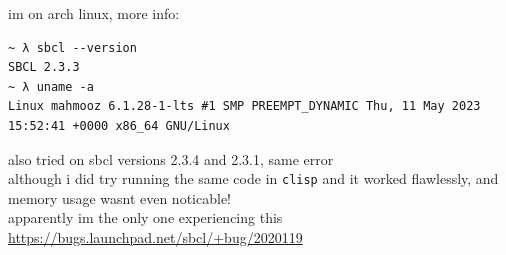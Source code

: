 \documentclass[a4paper,12pt]{article}
\begin{document}
im on arch linux, more info:\\
\lstset{language=bash,label= ,caption= ,captionpos=b,numbers=none}
\begin{lstlisting}
~ λ sbcl --version
SBCL 2.3.3
~ λ uname -a
Linux mahmooz 6.1.28-1-lts #1 SMP PREEMPT_DYNAMIC Thu, 11 May 2023 15:52:41 +0000 x86_64 GNU/Linux
\end{lstlisting}
also tried on sbcl versions 2.3.4 and 2.3.1, same error\\
although i did try running the same code in \texttt{clisp} and it worked flawlessly, and memory usage wasnt even noticable!\\
apparently im the only one experiencing this \url{https://bugs.launchpad.net/sbcl/+bug/2020119}
\end{document}

